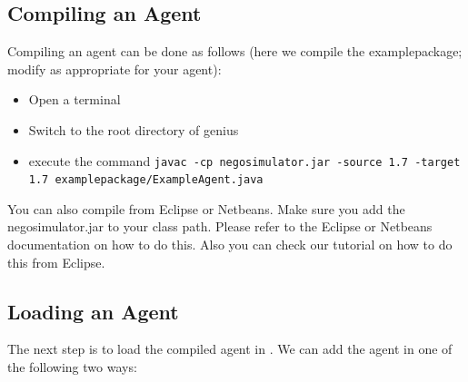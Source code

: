 \documentclass[]{article}
\begin{document}
\subsection{Compiling an Agent}
Compiling an agent can be done as follows (here we compile the examplepackage; modify as appropriate for your agent):
\begin{itemize}
\item Open a terminal
\item Switch to the root directory of genius
\item \raggedright execute the command \verb|javac -cp negosimulator.jar -source 1.7 -target 1.7 examplepackage/ExampleAgent.java|
\end{itemize}

You can also compile from Eclipse or Netbeans. Make sure you add the negosimulator.jar to your class path. Please refer to the Eclipse or Netbeans documentation on how to do this. Also you can check our tutorial on how to do this from Eclipse.

\subsection{Loading an Agent}
The next step is to load the compiled agent in \Genius. We can add the agent in one of the following two ways:
\end{document}
